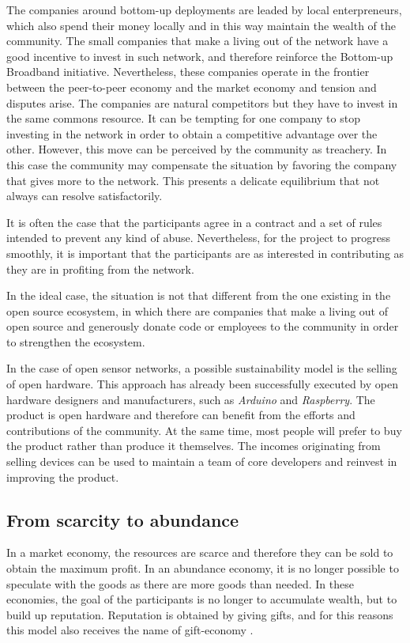 \documentclass[journal]{IEEEtran}
\begin{document}
The companies around bottom-up deployments are leaded by local enterpreneurs, which also spend their money locally and in this way maintain the wealth of the community.
The small companies that make a living out of the network have a good incentive to invest in such network, and therefore reinforce the Bottom-up Broadband initiative.
Nevertheless, these companies operate in the frontier between the peer-to-peer economy and the market economy and tension and disputes arise.
The companies are natural competitors but they have to invest in the same commons resource.
It can be tempting for one company to stop investing in the network in order to obtain a competitive advantage over the other.
However, this move can be perceived by the community as treachery.
In this case the community may compensate the situation by favoring the company that gives more to the network.
This presents a delicate equilibrium that not always can resolve satisfactorily.

It is often the case that the participants agree in a contract and a set of rules intended to prevent any kind of abuse.
Nevertheless, for the project to progress smoothly, it is important that the participants are as interested in contributing as they are in profiting from the network.

In the ideal case, the situation is not that different from the one existing in the open source ecosystem, in which there are companies that make a living out of open source and generously donate code or employees to the community in order to strengthen the ecosystem.

In the case of open sensor networks, a possible sustainability model is the selling of open hardware.
This approach has already been successfully executed by open hardware designers and manufacturers, such as \emph{Arduino} and \emph{Raspberry}.
The product is open hardware and therefore can benefit from the efforts and contributions of the community.
At the same time, most people will prefer to buy the product rather than produce it themselves.
The incomes originating from selling devices can be used to maintain a team of core developers and reinvest in improving the product.


\subsection{From scarcity to abundance}

In a market economy, the resources are scarce and therefore they can be sold to obtain the maximum profit.
In an abundance economy, it is no longer possible to speculate with the goods as there are more goods than needed.
In these economies, the goal of the participants is no longer to accumulate wealth, but to build up reputation.
Reputation is obtained by giving gifts, and for this reasons this model also receives the name of gift-economy \cite{barbrook1998htg}.
\end{document}
